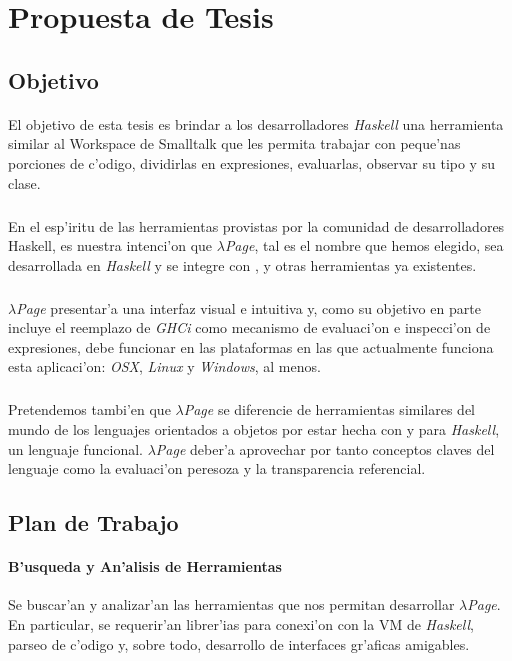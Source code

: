 \documentclass[a4paper]{article}
\begin{document}
\section{Propuesta de Tesis}
\subsection{Objetivo}
\paragraph{}El objetivo de esta tesis es brindar a los desarrolladores \textit{Haskell} una herramienta similar al Workspace de Smalltalk que les permita trabajar con peque'nas porciones de c'odigo, dividirlas en expresiones, evaluarlas, observar su tipo y su clase.
\subparagraph{}En el esp'iritu de las herramientas provistas por la comunidad de desarrolladores Haskell, es nuestra intenci'on que \textsl{$\lambda$Page}, tal es el nombre que hemos elegido, sea desarrollada en \textit{Haskell} y se integre con ,  y otras herramientas ya existentes.
\subparagraph{} \textsl{$\lambda$Page} presentar'a una interfaz visual e intuitiva y, como su
 objetivo en parte incluye el reemplazo de \textsl{GHCi} como mecanismo de evaluaci'on e  
 inspecci'on de expresiones, debe funcionar en las plataformas en las que actualmente funciona 
 esta aplicaci'on: \textsl{OSX}, \textsl{Linux} y \textsl{Windows}, al menos.
\subparagraph{}Pretendemos tambi'en que \textsl{$\lambda$Page} se diferencie de herramientas similares del mundo de los lenguajes orientados a objetos por estar hecha con y para \textit{Haskell}, un lenguaje funcional.  \textsl{$\lambda$Page} deber'a aprovechar por tanto conceptos claves del lenguaje como la evaluaci'on peresoza y la transparencia referencial.

\subsection{Plan de Trabajo}
\paragraph{B'usqueda y An'alisis de Herramientas} Se buscar'an y analizar'an las herramientas que nos permitan desarrollar \textsl{$\lambda$Page}.  En particular, se requerir'an librer'ias para conexi'on con la VM de \textit{Haskell}, parseo de c'odigo y, sobre todo, desarrollo de interfaces gr'aficas amigables.
\end{document}
